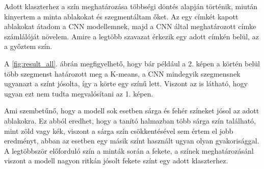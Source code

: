 Adott klaszterhez a szín meghatározása többségi döntés alapján történik, miután kinyertem a minta ablakokat és szegmentáltam őket. Az egy címkét kapott ablakokat átadom a CNN modellemnek, majd a CNN által meghatározott címke számlálóját növelem. Amire a legtöbb szavazat érkezik egy adott címkén belül, az a győztem szín.

A \ref{fig:result_all}. ábrán megfigyelhető, hogy bár például a 2. képen a körtén belül több szegmenst határozott meg a K-means, a CNN mindegyik szegmensnek ugyanazt a színt jósolta, így a körte egy színű lett. Viszont az is látható, hogy ugyan ezt nem tudta megvalósítani az 1. képen. 

Ami szembetűnő, hogy a modell sok esetben sárga és fehér színeket jósol az adott ablakokra. Ez abból eredhet, hogy a tanító halmazban több sárga szín található, mint zöld vagy kék, viszont a sárga szín csökkentésével sem értem el jobb eredményt, abban az esetben egy másik színt használt ugyan olyan gyakorisággal. A legtöbbször előforduló szín a minták során a fekete, a színek meghatározásánl viszont a modell nagyon ritkán jósolt fekete színt egy adott klaszterhez.  